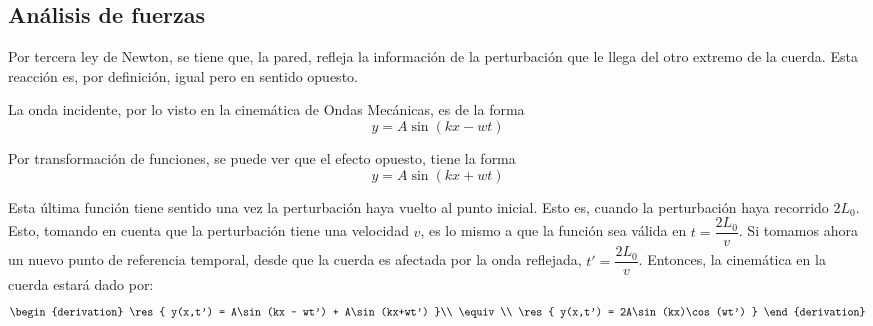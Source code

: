 \subsection{Análisis de fuerzas}

Por tercera ley de Newton, se tiene que, la pared, refleja la
información de la perturbación que le llega del otro extremo de la
cuerda. Esta reacción es, por definición, igual pero en sentido opuesto.

\begin{center}
\end{center}

La onda incidente, por lo visto en la cinemática de Ondas Mecánicas, es
de la forma
\[y = A\sin\left(kx - wt\right)\]

Por transformación de funciones, se puede ver que el efecto opuesto,
tiene la forma
\[y = A\sin(kx + wt)\]

Esta última función tiene sentido una vez la perturbación haya vuelto
al punto inicial. Esto es, cuando la perturbación haya recorrido $2L_0$.
Esto, tomando en cuenta que la perturbación tiene una velocidad $v$, es
lo mismo a que la función sea válida en $t = \dfrac{2L_0}{v}$.
Si tomamos ahora un nuevo punto de referencia temporal, desde que la
cuerda es afectada por la onda reflejada, $t'=\dfrac{2L_0}{v}$.
Entonces, la cinemática en la cuerda estará dado por:
\[
    \begin{derivation}
            \res{ y(x,t') = A\sin(kx - wt') + A\sin(kx+wt') }\\
        \equiv\\
            \res{ y(x,t') = 2A\sin(kx)\cos(wt') }
    \end{derivation}
\]

